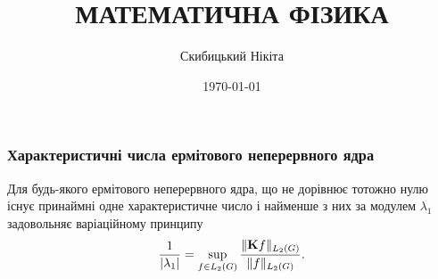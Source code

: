  

 \title{{\Huge МАТЕМАТИЧНА ФІЗИКА}}
 \author{Скибицький Нікіта}
 \date{\today}

 

 

 \tableofcontents

%

 \setcounter{section}{2}
 \setcounter{subsection}{3}
 \setcounter{subsubsection}{0}
 \setcounter{theorem}{14}
 \setcounter{equation}{4}

\subsubsection{Характеристичні числа ермітового неперервного ядра}

\begin{theorem}
	Для будь-якого ермітового неперервного ядра, що не дорівнює тотожно нулю існує принаймні одне характеристичне число і найменше з них за модулем $\lambda_1$ задовольняє варіаційному принципу
	\begin{equation}
		\dfrac{1}{|\lambda_1|} = \displaystyle\sup\limits_{f \in L_2(G)} \dfrac{\|\textbf{K} f\|_{L_2(G)}}{\|f\|_{L_2(G)}}.
	\end{equation}
\end{theorem}

